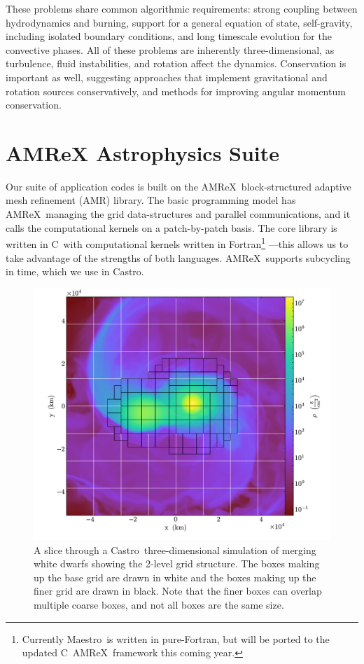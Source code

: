 \documentclass[a4paper]{jpconf}
\newcommand{\maestro}{{\sffamily Maestro}}
\newcommand{\castro}{{\sffamily Castro}}
\newcommand{\amrex}{{\sffamily AMReX}}
\newcommand{\cpp}{C\nolinebreak\hspace{-.05em}\raisebox{.4ex}{\tiny\bf +}\nolinebreak\hspace{-.10em}\raisebox{.4ex}{\tiny\bf +}}
\begin{document}
These problems share common algorithmic requirements: strong coupling
between hydrodynamics and burning, support for a general equation of state,
self-gravity, including isolated boundary conditions, and long timescale
evolution for the convective phases.  All of these problems are inherently
three-dimensional, as turbulence, fluid instabilities, and rotation affect
the dynamics.  Conservation is important as well, suggesting approaches
that implement gravitational and rotation sources conservatively, and
methods for improving angular momentum conservation.


\section{AMReX Astrophysics Suite}

Our suite of application codes is built on the
\amrex\ block-structured adaptive mesh refinement (AMR) library.  The
basic programming model has \amrex\ managing the grid data-structures
and parallel communications, and it calls the computational kernels on
a patch-by-patch basis.  The core library is written in \cpp\ with 
computational kernels written in Fortran\footnote{Currently
\maestro\ is written in pure-Fortran, but will be
 ported to the updated \cpp\ \amrex\ framework this coming year.}
---this allows us to take
advantage of the strengths of both languages. \amrex\ supports subcycling
in time, which we use in \castro.
\begin{figure}[t]
\centering
\includegraphics[width=0.58\linewidth]{slice_grid}
\begin{minipage}[b]{0.38\linewidth}
\caption{\label{fig:amr_grid} A slice through a
  \castro\ three-dimensional simulation of merging white dwarfs
  showing the 2-level grid structure.  The boxes making up the base
  grid are drawn in white and the boxes making up the finer grid are drawn in black.  Note
  that the finer boxes can overlap multiple coarse boxes, and not all
  boxes are the same size.\vspace{2em}}
\end{minipage}
\end{figure}
\end{document}
